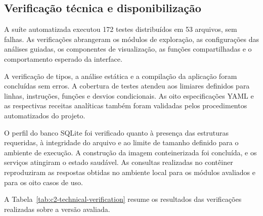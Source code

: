 \subsection{Verificação técnica e disponibilização}

A suíte automatizada executou 172 testes distribuídos em 53 arquivos, sem
falhas. As verificações abrangeram os módulos de exploração, as configurações
das análises guiadas, os componentes de visualização, as funções
compartilhadas e o comportamento esperado da interface.

A verificação de tipos, a análise estática e a compilação da aplicação foram
concluídas sem erros. A cobertura de testes atendeu aos limiares definidos
para linhas, instruções, funções e desvios condicionais. As oito
especificações YAML e as respectivas receitas analíticas também foram
validadas pelos procedimentos automatizados do projeto.

O perfil do banco SQLite foi verificado quanto à presença das estruturas
requeridas, à integridade do arquivo e ao limite de tamanho definido para o
ambiente de execução. A construção da imagem conteinerizada foi concluída, e
os serviços atingiram o estado saudável. As consultas realizadas no
contêiner reproduziram as respostas obtidas no ambiente local para os módulos
avaliados e para os oito casos de uso.

A Tabela~\ref{tab:c2-technical-verification} resume os resultados das
verificações realizadas sobre a versão avaliada.

